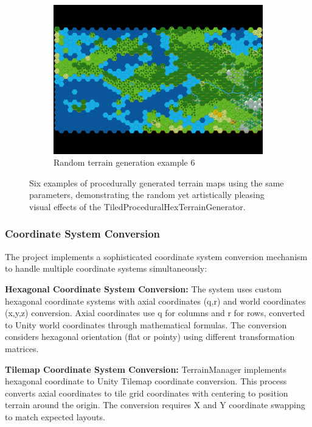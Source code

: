 \documentclass[english]{tudscrreprt}
\begin{document}
\begin{figure}[h]
\begin{subfigure}[b]{0.32\textwidth}
    \includegraphics[width=\textwidth]{figures/hexGrid6.png}
    \caption{Random terrain generation example 6}
    \label{fig:terrain_6}
\end{subfigure}
\caption{Six examples of procedurally generated terrain maps using the same parameters, demonstrating the random yet artistically pleasing visual effects of the TiledProceduralHexTerrainGenerator.}
\label{fig:terrain_generation_examples}
\end{figure}


\subsubsection{Coordinate System Conversion}
The project implements a sophisticated coordinate system conversion mechanism to handle multiple coordinate systems simultaneously:

\textbf{Hexagonal Coordinate System Conversion:} The system uses custom hexagonal coordinate systems with axial coordinates (q,r) and world coordinates (x,y,z) conversion. Axial coordinates use q for columns and r for rows, converted to Unity world coordinates through mathematical formulas. The conversion considers hexagonal orientation (flat or pointy) using different transformation matrices.

\textbf{Tilemap Coordinate System Conversion:} TerrainManager implements hexagonal coordinate to Unity Tilemap coordinate conversion. This process converts axial coordinates to tile grid coordinates with centering to position terrain around the origin. The conversion requires X and Y coordinate swapping to match expected layouts.
\end{document}
